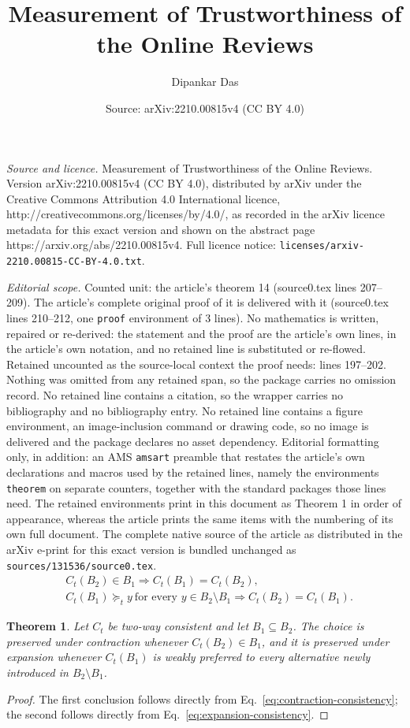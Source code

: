 \documentclass[10pt,a4paper]{amsart}
\title{Measurement of Trustworthiness of the Online Reviews}
\author{Dipankar Das}
\date{Source: arXiv:2210.00815v4 (CC BY 4.0)}
\newtheorem{theorem}{Theorem}
\begin{document}
\maketitle

\noindent\emph{Source and licence.} Measurement of Trustworthiness of the Online Reviews. Version arXiv:2210.00815v4 (CC BY 4.0), distributed by arXiv under the Creative Commons Attribution 4.0 International licence, http://creativecommons.org/licenses/by/4.0/, as recorded in the arXiv licence metadata for this exact version and shown on the abstract page https://arxiv.org/abs/2210.00815v4. Full licence notice: \texttt{licenses/arxiv-2210.00815-CC-BY-4.0.txt}.\par\smallskip

\noindent\textit{Editorial scope.} Counted unit: the article's theorem 14 (source0.tex lines 207--209). The article's complete original proof of it is delivered with it (source0.tex lines 210--212, one \texttt{proof} environment of 3 lines). No mathematics is written, repaired or re-derived: the statement and the proof are the article's own lines, in the article's own notation, and no retained line is substituted or re-flowed.  Retained uncounted as the source-local context the proof needs: lines 197--202.  Nothing was omitted from any retained span, so the package carries no omission record.  No retained line contains a citation, so the wrapper carries no bibliography and no bibliography entry.  No retained line contains a figure environment, an image-inclusion command or drawing code, so no image is delivered and the package declares no asset dependency.  Editorial formatting only, in addition: an AMS \texttt{amsart} preamble that restates the article's own declarations and macros used by the retained lines, namely the environments \texttt{theorem} on separate counters, together with the standard packages those lines need.  The retained environments print in this document as Theorem 1 in order of appearance, whereas the article prints the same items with the numbering of its own full document.  The complete native source of the article as distributed in the arXiv e-print for this exact version is bundled unchanged as \texttt{sources/131536/source0.tex}.
		\begin{align}
		&C_t(B_2)\in B_1
		\Longrightarrow C_t(B_1)=C_t(B_2),\label{eq:contraction-consistency}\\
		&C_t(B_1)\succcurlyeq_t y\ \text{for every }y\in B_2\setminus B_1
		\Longrightarrow C_t(B_2)=C_t(B_1).\label{eq:expansion-consistency}
		\end{align}

		\begin{theorem}\label{14}
			Let $C_t$ be two-way consistent and let $B_1\subseteq B_2$. The choice is preserved under contraction whenever $C_t(B_2)\in B_1$, and it is preserved under expansion whenever $C_t(B_1)$ is weakly preferred to every alternative newly introduced in $B_2\setminus B_1$.
		\end{theorem}

		\begin{proof}
			The first conclusion follows directly from Eq.~\eqref{eq:contraction-consistency}; the second follows directly from Eq.~\eqref{eq:expansion-consistency}.
		\end{proof}
\end{document}

